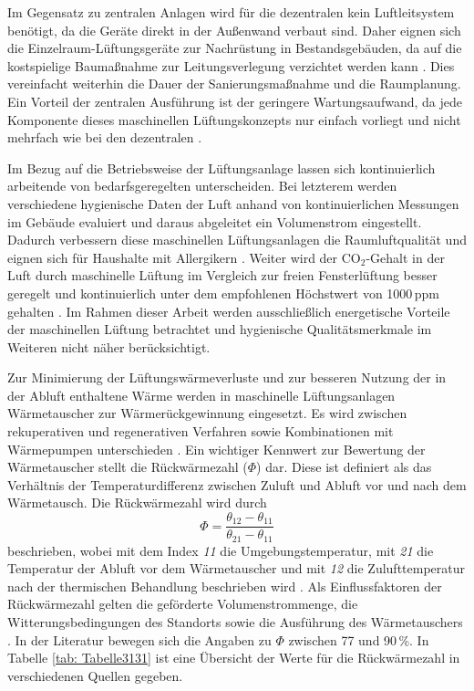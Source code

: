 Im Gegensatz zu zentralen Anlagen wird für die dezentralen kein Luftleitsystem benötigt, da die Geräte direkt in der Außenwand verbaut sind.
Daher eignen sich die Einzelraum-Lüftungsgeräte zur Nachrüstung in Bestandsgebäuden, da auf die kostspielige Baumaßnahme zur Leitungsverlegung verzichtet werden kann \cite{Manz.2000}.
Dies vereinfacht weiterhin die Dauer der Sanierungsmaßnahme und die Raumplanung. 
Ein Vorteil der zentralen Ausführung ist der geringere Wartungsaufwand, da jede Komponente dieses maschinellen Lüftungskonzepts nur einfach vorliegt und nicht mehrfach wie bei den dezentralen \cite{Horner.2014}.

Im Bezug auf die Betriebsweise der Lüftungsanlage lassen sich kontinuierlich arbeitende von bedarfsgeregelten unterscheiden.
Bei letzterem werden verschiedene hygienische Daten der Luft anhand von kontinuierlichen Messungen im Gebäude evaluiert und daraus abgeleitet ein Volumenstrom eingestellt.
Dadurch verbessern diese maschinellen Lüftungsanlagen die Raumluftqualität und eignen sich für Haushalte mit Allergikern \cite{Fechner.2014}.
Weiter wird der CO\(_2\)-Gehalt in der Luft durch maschinelle Lüftung im Vergleich zur freien Fensterlüftung besser geregelt und kontinuierlich unter dem empfohlenen Höchstwert von 1000\,ppm gehalten \cite{Suszanowicz.2018}.
Im Rahmen dieser Arbeit werden ausschließlich energetische Vorteile der maschinellen Lüftung betrachtet und hygienische Qualitätsmerkmale im Weiteren nicht näher berücksichtigt.

Zur Minimierung der Lüftungswärmeverluste und zur besseren Nutzung der in der Abluft enthaltene Wärme werden in maschinelle Lüftungsanlagen Wärmetauscher zur Wärmerückgewinnung eingesetzt.
Es wird zwischen rekuperativen und regenerativen Verfahren sowie Kombinationen mit Wärmepumpen unterschieden \cite{Kamendere.2015}.
Ein wichtiger Kennwert zur Bewertung der Wärmetauscher stellt die Rückwärmezahl (\(\Phi\)) dar.
Diese ist definiert als das Verhältnis der Temperaturdifferenz zwischen Zuluft und Abluft vor und nach dem Wärmetausch.
Die Rückwärmezahl wird durch
\begin{equation}
\label{eq:Gleichung3131}
\Phi = \frac{\theta_{12} - \theta_{11}}{\theta_{21} - \theta_{11}}
\end{equation}
beschrieben, wobei mit dem Index \textit{11} die Umgebungstemperatur, mit \textit{21} die Temperatur der Abluft vor dem Wärmetauscher und mit \textit{12} die Zulufttemperatur nach der thermischen Behandlung beschrieben wird \cite{Pech.2006b}.
Als Einflussfaktoren der Rückwärmezahl gelten die geförderte Volumenstrommenge, die Witterungsbedingungen des Standorts sowie die Ausführung des Wärmetauschers \cite{Kamendere.2015}.
In der Literatur bewegen sich die Angaben zu \(\Phi\) zwischen 77 und 90\,\%.
In Tabelle \ref{tab: Tabelle3131} ist eine Übersicht der Werte für die Rückwärmezahl in verschiedenen Quellen gegeben.

